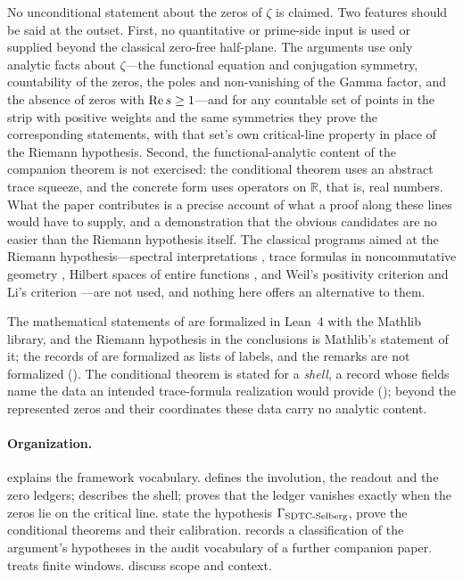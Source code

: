 No unconditional statement about the zeros of \(\zeta\) is claimed.
Two features should be said at the outset.  First, no quantitative or prime-side input is used or supplied beyond
the classical zero-free half-plane.  The arguments use
only analytic facts about \(\zeta\)---the functional equation and
conjugation symmetry, countability of the zeros, the poles and non-vanishing of the Gamma factor, and the absence of zeros with \(\operatorname{Re} s\geq1\)---and
for any countable set of points in the strip with positive weights and
the same symmetries they prove the corresponding statements, with that
set's own critical-line property in place of the Riemann hypothesis.  Second, the functional-analytic content of the
companion theorem is not exercised: the conditional theorem uses an
abstract trace squeeze, and the concrete form uses operators on
\(\mathbb R\), that is, real numbers.  What the paper contributes is a
precise account of what a proof along these lines would have to supply,
and a demonstration that the obvious candidates are no easier than the
Riemann hypothesis itself.  The classical programs aimed at the Riemann
hypothesis---spectral interpretations \citep{BerryKeating1990},
trace formulas in noncommutative geometry \citep{Connes1999}, Hilbert
spaces of entire functions \citep{deBranges1968,deBranges1986}, and
Weil's positivity criterion \citep{Weil1952,Bombieri2000} and Li's
criterion \citep{Li1997}---are not used, and nothing here offers an
alternative to them.

The mathematical statements of
are formalized in Lean~4 with the Mathlib library, and the Riemann
hypothesis in the conclusions is Mathlib's statement of it; the records
of  are formalized as lists of labels, and
the remarks are not formalized ().  The
conditional theorem is stated for a \emph{shell}, a record whose
fields name the data an intended trace-formula realization would
provide (); beyond the represented zeros and
their coordinates these data carry no analytic content.

\paragraph{Organization.}
 explains the framework vocabulary.
 defines the involution, the readout
and the zero ledgers;  describes the shell;
 proves that the ledger vanishes exactly
when the zeros lie on the critical line.
 state the hypothesis
\(\Gamma_{\mathrm{SDTC\text{-}Selberg}}\), prove the conditional theorems and their
calibration.   records a classification of
the argument's hypotheses in the audit vocabulary of a further
companion paper.   treats finite windows.
 discuss
scope and context.

